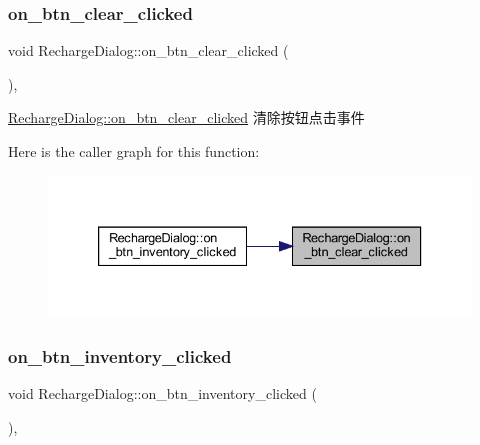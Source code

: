 \subsubsection{\texorpdfstring{on\_btn\_clear\_clicked}{on\_btn\_clear\_clicked}}
{\footnotesize\ttfamily void Recharge\+Dialog\+::on\+\_\+btn\+\_\+clear\+\_\+clicked (\begin{DoxyParamCaption}{ }\end{DoxyParamCaption})\hspace{0.3cm}{\ttfamily [private]}, {\ttfamily [slot]}}



\mbox{\hyperlink{class_recharge_dialog_a39a0878875f9127332f474cac43d1ed3}{Recharge\+Dialog\+::on\+\_\+btn\+\_\+clear\+\_\+clicked}} 清除按钮点击事件 

Here is the caller graph for this function\+:
\nopagebreak
\begin{figure}[H]
\begin{center}
\leavevmode
\includegraphics[width=333pt]{class_recharge_dialog_a39a0878875f9127332f474cac43d1ed3_icgraph}
\end{center}
\end{figure}
\mbox{\label{class_recharge_dialog_aafd9329cbf935615b90bb79350681f8b}} 
\subsubsection{\texorpdfstring{on\_btn\_inventory\_clicked}{on\_btn\_inventory\_clicked}}
{\footnotesize\ttfamily void Recharge\+Dialog\+::on\+\_\+btn\+\_\+inventory\+\_\+clicked (\begin{DoxyParamCaption}{ }\end{DoxyParamCaption})\hspace{0.3cm}{\ttfamily [private]}, {\ttfamily [slot]}}



